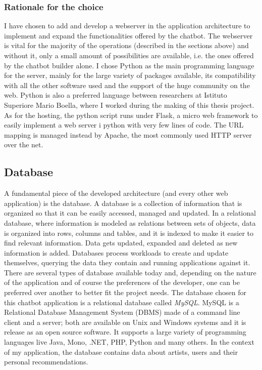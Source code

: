 \documentclass[b5paper,10pt,twoside,cucitura]{toptesi}
\begin{document}
\subsubsection{Rationale for the choice}
I have chosen to add and develop a webserver in the application architecture to implement and expand the functionalities offered by the chatbot. The webserver is vital for the majority of the operations (described in the sections above) and without it, only a small amount of possibilities are available, i.e. the ones offered by the chatbot builder alone. I chose Python as the main programming language for the server, mainly for the large variety of packages available, its compatibility with all the other software used and the support of the huge community on the web. Python is also a preferred language between researchers at Istituto Superiore Mario Boella, where I worked during the making of this thesis project. As for the hosting, the python script runs under Flask, a micro web framework to easily implement a web server i python with very few lines of code. The URL mapping is managed instead by Apache, the most commonly used HTTP server over the net.

\subsection{Database}
A fundamental piece of the developed architecture (and every other web application) is the database. A database is a collection of information that is organized so that it can be easily accessed, managed and updated. In a relational database, where information is modeled as relations between sets of objects, data is organized into rows, columns and tables, and it is indexed to make it easier to find relevant information. Data gets updated, expanded and deleted as new information is added. Databases process workloads to create and update themselves, querying the data they contain and running applications against it. 
\\
There are several types of database available today and, depending on the nature of the application and of course the preferences of the developer, one can be preferred over another to better fit the project needs.
The database chosen for this chatbot application is a relational database called \textit{MySQL}. MySQL is a Relational Database Management System (DBMS) made of a command line client and a server; both are available on Unix and Windows systems and it is release as an open source software. It supports a large variety of programming languages live Java, Mono, .NET, PHP, Python and many others. In the context of my application, the database contains data about artists, users and their personal recommendations.
\end{document}
